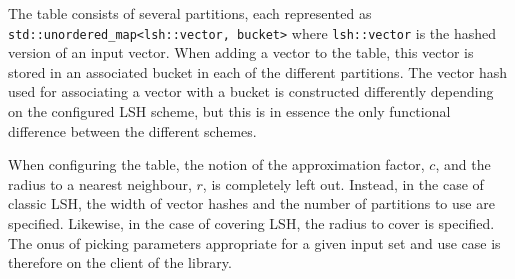 The table consists of several partitions, each represented as \texttt{std::unordered\_map<lsh::vector, bucket>} where \texttt{lsh::vector} is the hashed version of an input vector. When adding a vector to the table, this vector is stored in an associated bucket in each of the different partitions. The vector hash used for associating a vector with a bucket is constructed differently depending on the configured LSH scheme, but this is in essence the only functional difference between the different schemes.

When configuring the table, the notion of the approximation factor, $c$, and the radius to a nearest neighbour, $r$, is completely left out. Instead, in the case of classic LSH, the width of vector hashes and the number of partitions to use are specified. Likewise, in the case of covering LSH, the radius to cover is specified. The onus of picking parameters appropriate for a given input set and use case is therefore on the client of the library.
